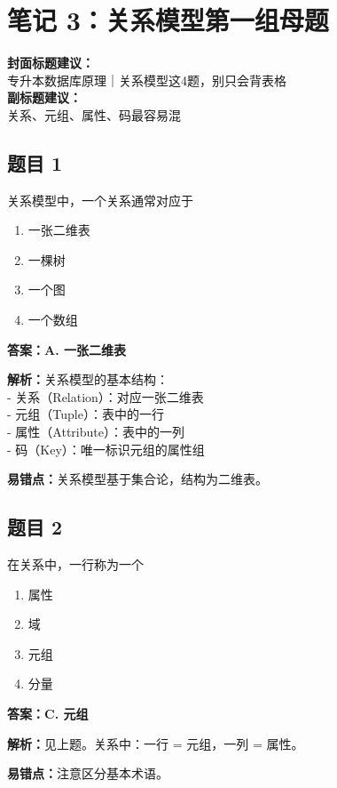 \documentclass[12pt,a4paper]{ctexart}
\begin{document}
\section{笔记 3：关系模型第一组母题}
\begin{coverbox}
	\textbf{封面标题建议：}\\
	专升本数据库原理｜关系模型这4题，别只会背表格\\
	\textbf{副标题建议：}\\
	关系、元组、属性、码最容易混
\end{coverbox}

\subsection*{题目 1}
关系模型中，一个关系通常对应于
\begin{enumerate}[label=\Alph*.]
	\item 一张二维表
	\item 一棵树
	\item 一个图
	\item 一个数组
\end{enumerate}

\begin{answerbox}
	\textbf{答案：A. 一张二维表}

	\textbf{解析：}关系模型的基本结构：\\
	- 关系（Relation）：对应一张二维表\\
	- 元组（Tuple）：表中的一行\\
	- 属性（Attribute）：表中的一列\\
	- 码（Key）：唯一标识元组的属性组

	\textbf{易错点：}关系模型基于集合论，结构为二维表。
\end{answerbox}

\subsection*{题目 2}
在关系中，一行称为一个
\begin{enumerate}[label=\Alph*.]
	\item 属性
	\item 域
	\item 元组
	\item 分量
\end{enumerate}

\begin{answerbox}
	\textbf{答案：C. 元组}

	\textbf{解析：}见上题。关系中：一行 = 元组，一列 = 属性。

	\textbf{易错点：}注意区分基本术语。
\end{answerbox}
\end{document}
